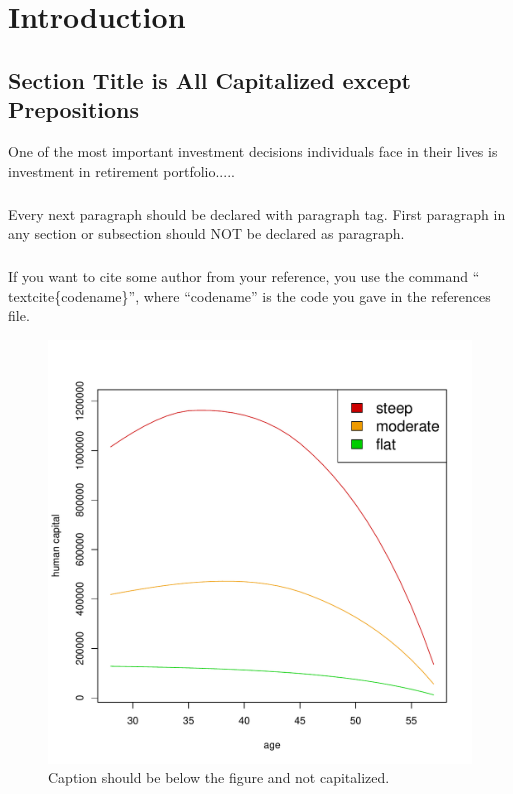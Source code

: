 \chapter{Introduction} %
\label{intro} %


\section{Section Title is All Capitalized except Prepositions}
One of the most important investment decisions individuals face in their lives is investment in retirement portfolio.....
\paragraph*{}
Every next paragraph should be declared with paragraph tag. First paragraph in any section or subsection should NOT be declared as paragraph. 
\paragraph*{}If you want to cite some author from your reference, you use the command ``\\textcite\{codename\}'', where ``codename'' is the code you gave in the references file.

\begin{figure}
    \centering
    \includegraphics[scale=0.5]{figs/humancapital.pdf}
    \caption{Caption should be below the figure and not capitalized.}
\end{figure}



